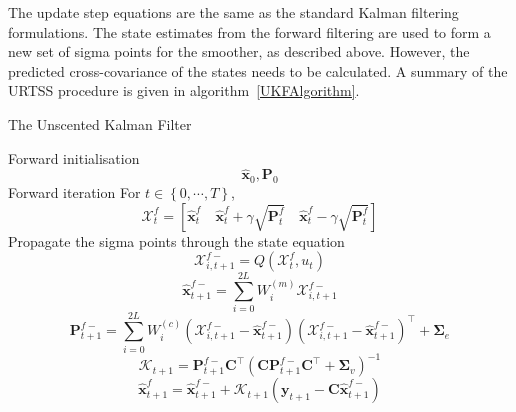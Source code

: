 \documentclass[12pt]{iopart}
\begin{document}
The update step equations are the same as the standard Kalman filtering formulations. The state estimates from the forward filtering are used to form a new set of sigma points for the smoother, as described above. However, the predicted cross-covariance of the states needs to be calculated. A summary of the URTSS procedure is given in algorithm~\ref{UKFAlgorithm}. 
\begin{algorithm}
	\caption{The Unscented Kalman Filter}\label{UKFAlgorithm} 
	\begin{algorithmic}[1] 
		\State Forward initialisation 
		\begin{equation*}
			\hat{\mathbf x}_0, \mathbf P_0 
		\end{equation*}
		\State Forward iteration For $t \in \left\lbrace 0,\cdots, T\right\rbrace $, 
		\begin{equation*}
			\mathcal X_t^f=[\hat{\mathbf x}_t^f \quad \hat{\mathbf x}_t^f+\gamma\sqrt{\mathbf P_t^f} \quad \hat{\mathbf x}_t^{f}-\gamma\sqrt{\mathbf P_t^f}] 
		\end{equation*}
		Propagate the sigma points through the state equation 
		\begin{equation}
			\mathcal X_{i,t+1}^{f-}=Q(\mathcal X_t^f,u_t) 
		\end{equation}
		\begin{equation*}
			\hat{\mathbf x}_{t+1}^{f-}=\sum_{i=0}^{2L} W_i^{(m)}\mathcal X_{i,t+1}^{f-} 
		\end{equation*}
		\begin{equation*}
			\mathbf P_{t +1}^{f-}=\sum_{i=0}^{2L} W_i^{(c)}(\mathcal X_{i,t+1}^{f-}-\hat{\mathbf x}_{t +1}^{f-})(\mathcal X_{i,t+1}^{f-}-\hat{\mathbf x}_{t +1}^{f-})^\top+\boldsymbol \Sigma_e 
		\end{equation*}
		\begin{equation*}
			\mathcal K_{t+1}=\mathbf P_{t +1}^{f-}\mathbf C ^\top(\mathbf C \mathbf P_{t +1}^{f-}\mathbf C ^\top+\boldsymbol \Sigma_v)^{-1} 
		\end{equation*}
		\begin{equation*}
			\hat{\mathbf x}_{t+1}^{f}=\hat{\mathbf x}_{t+1}^{f-}+\mathcal K_{t+1}(\mathbf y_{t+1}-\mathbf C\hat{\mathbf x}_{t +1}^{f-}) 
		\end{equation*}

\end{algorithmic}
\end{algorithm}
\end{document}
